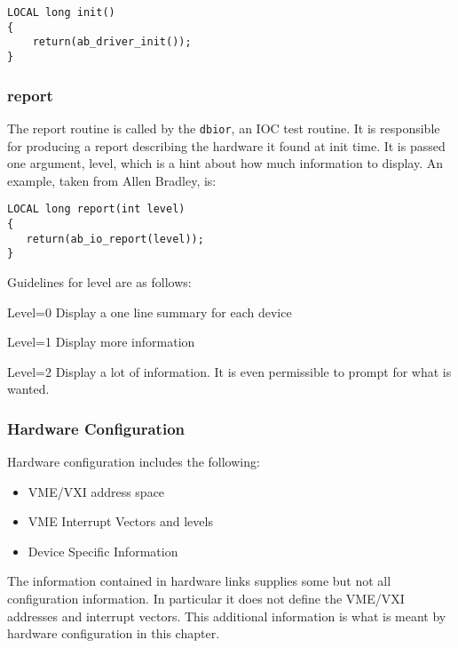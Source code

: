 \begin{verbatim}LOCAL long init()
{
    return(ab_driver_init());
}
\end{verbatim}\subsubsection{report}

The report routine is called by the \verb|dbior|, an IOC test routine. It is responsible for producing a report describing the 
hardware it found at init time. It is passed one argument, level, which is a hint about how much information to display. An 
example, taken from Allen Bradley, is:

\begin{verbatim}LOCAL long report(int level)
{
   return(ab_io_report(level));
}
\end{verbatim}Guidelines for level are as follows:

\begin{description}\item Level=0 Display a one line summary for each device

\item Level=1 Display more information

\item Level=2 Display a lot of information. It is even permissible to prompt for what is wanted.

\end{description}\subsubsection{Hardware Configuration}

Hardware configuration includes the following:

\begin{itemize}\item VME/VXI address space

\item VME Interrupt Vectors and levels

\item Device Specific Information

\end{itemize}The information contained in hardware links supplies some but not all configuration information. In particular it does not 
define the VME/VXI addresses and interrupt vectors. This additional information is what is meant by hardware 
configuration in this chapter.

